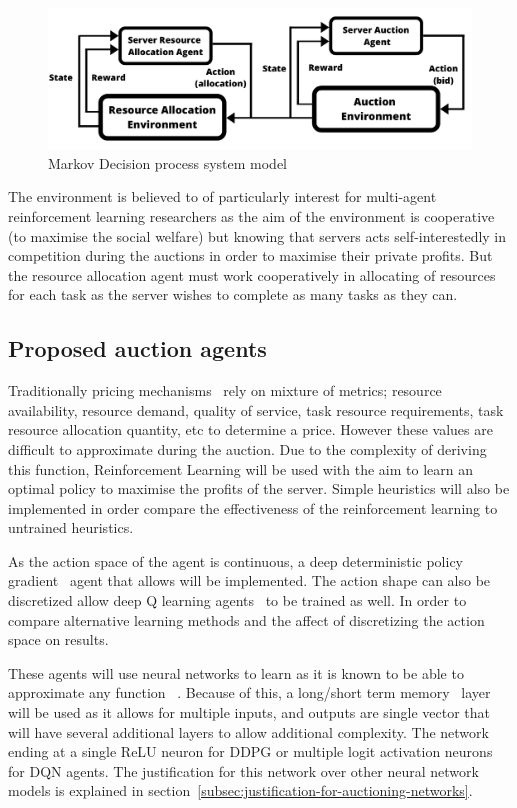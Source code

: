\begin{figure}
    \centering
    \includegraphics[width=14cm]{figures/flexible_resource_allocation_env.pdf}
    \caption{Markov Decision process system model}
    \label{fig:mdp_system_model}
\end{figure}

The environment is believed to of particularly interest for multi-agent reinforcement learning researchers as the aim
of the environment is cooperative (to maximise the social welfare) but knowing that servers acts self-interestedly in
competition during the auctions in order to maximise their private profits. But the resource allocation agent must work
cooperatively in allocating of resources for each task as the server wishes to complete as many tasks as they can.

\subsection{Proposed auction agents}\label{subsec:proposed-auction-agents}
Traditionally pricing mechanisms~\citep{al2013cloud} rely on mixture of metrics; resource availability, resource demand,
quality of service, task resource requirements, task resource allocation quantity, etc to determine a price. However
these values are difficult to approximate during the auction. Due to the complexity of deriving this function,
Reinforcement Learning will be used with the aim to learn an optimal policy to maximise the profits of the server.
Simple heuristics will also be implemented in order compare the effectiveness of the reinforcement learning to
untrained heuristics.

As the action space of the agent is continuous, a deep deterministic policy gradient~\citep{ddpg} agent that allows
will be implemented. The action shape can also be discretized allow deep Q learning agents~\cite{atari} to be trained
as well. In order to compare alternative learning methods and the affect of discretizing the action space on results.

These agents will use neural networks to learn as it is known to be able to approximate any function
~\citep{csaji2001approximation}.
Because of this, a long/short term memory~\citep{LSTM} layer will be used as it allows for multiple inputs, and outputs
are single vector that will have several additional layers to allow additional complexity.
The network ending at a single ReLU neuron for DDPG or multiple logit activation neurons for DQN agents. The
justification for this network over other neural network models is explained in
section~\ref{subsec:justification-for-auctioning-networks}.

